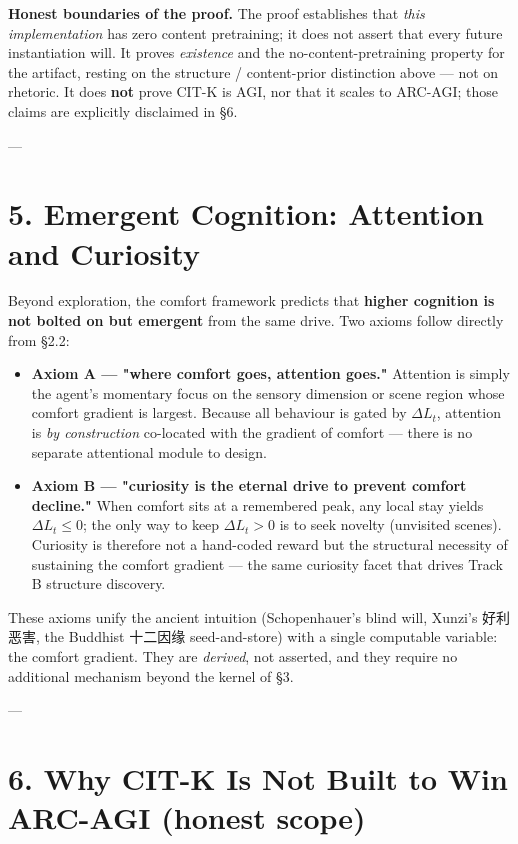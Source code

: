 \documentclass[11pt]{article}
\begin{document}
\textbf{Honest boundaries of the proof.} The proof establishes that \emph{this implementation} has zero content pretraining; it does not assert that every future instantiation will. It proves \emph{existence} and the no-content-pretraining property for the artifact, resting on the structure / content-prior distinction above — not on rhetoric. It does \textbf{not} prove CIT-K is AGI, nor that it scales to ARC-AGI; those claims are explicitly disclaimed in §6.

---

\section{5. Emergent Cognition: Attention and Curiosity}

Beyond exploration, the comfort framework predicts that \textbf{higher cognition is not bolted on but emergent} from the same drive. Two axioms follow directly from §2.2:

\begin{itemize}
\item \textbf{Axiom A — "where comfort goes, attention goes."} Attention is simply the agent's momentary focus on the sensory dimension or scene region whose comfort gradient is largest. Because all behaviour is gated by $\Delta L_t$, attention is \emph{by construction} co-located with the gradient of comfort — there is no separate attentional module to design.
\item \textbf{Axiom B — "curiosity is the eternal drive to prevent comfort decline."} When comfort sits at a remembered peak, any local stay yields $\Delta L_t\le 0$; the only way to keep $\Delta L_t>0$ is to seek novelty (unvisited scenes). Curiosity is therefore not a hand-coded reward but the structural necessity of sustaining the comfort gradient — the same curiosity facet that drives Track B structure discovery.
\end{itemize}

These axioms unify the ancient intuition (Schopenhauer's blind will, Xunzi's 好利恶害, the Buddhist 十二因缘 seed-and-store) with a single computable variable: the comfort gradient. They are \emph{derived}, not asserted, and they require no additional mechanism beyond the kernel of §3.

---

\section{6. Why CIT-K Is Not Built to Win ARC-AGI (honest scope)}
\end{document}
